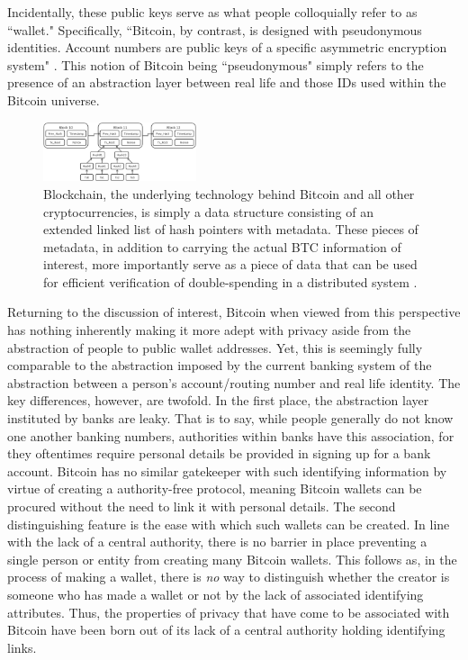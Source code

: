\documentclass[journal]{IEEEtran}
\begin{document}
Incidentally, these public keys serve as what people colloquially refer to as ``wallet." Specifically, ``Bitcoin, by contrast, is designed with pseudonymous identities. Account numbers are public keys of a specific asymmetric encryption system" \cite{laundering}. This notion of Bitcoin being ``pseudonymous" simply refers to the presence of an abstraction layer between real life and those IDs used within the Bitcoin universe.

\begin{figure}
    \label{fig:blockchain}
    \centering
    \includegraphics[width=0.4\textwidth]{blockchain.png}
    \caption{Blockchain, the underlying technology behind Bitcoin and all other cryptocurrencies, is simply a data structure consisting of an extended linked list of hash pointers with metadata. These pieces of metadata, in addition to carrying the actual BTC information of interest, more importantly serve as a piece of data that can be used for efficient verification of double-spending in a distributed system \cite{blockchain-img}.}
\end{figure}

Returning to the discussion of interest, Bitcoin when viewed from this perspective has nothing inherently making it more adept with privacy aside from the abstraction of people to public wallet addresses. Yet, this is seemingly fully comparable to the abstraction imposed by the current banking system of the abstraction between a person's account/routing number and real life identity. The key differences, however, are twofold. In the first place, the abstraction layer instituted by banks are leaky. That is to say, while people generally do not know one another banking numbers, authorities within banks have this association, for they oftentimes require personal details be provided in signing up for a bank account. Bitcoin has no similar gatekeeper with such identifying information by virtue of creating a authority-free protocol, meaning Bitcoin wallets can be procured without the need to link it with personal details. The second distinguishing feature is the ease with which such wallets can be created. In line with the lack of a central authority, there is no barrier in place preventing a single person or entity from creating many Bitcoin wallets. This follows as, in the process of making a wallet, there is \textit{no} way to distinguish whether the creator is someone who has made a wallet or not by the lack of associated identifying attributes. Thus, the properties of privacy that have come to be associated with Bitcoin have been born out of its lack of a central authority holding identifying links. 
\end{document}
